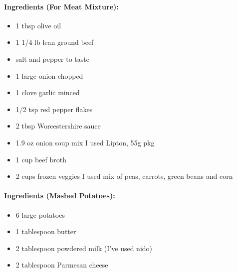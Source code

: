 \documentclass{article}
\begin{document}
\paragraph{Ingredients (For Meat Mixture):}
\begin{itemize}
    \item 1 tbsp olive oil
    \item 1 1/4 lb lean ground beef
    \item salt and pepper to taste
    \item 1 large onion chopped
    \item 1 clove garlic minced
    \item 1/2 tsp red pepper flakes
    \item 2 tbsp Worcestershire sauce
    \item 1.9 oz onion soup mix I used Lipton, 55g pkg
    \item 1 cup beef broth
    \item 2 cups frozen veggies I used mix of peas, carrots, green beans and corn
\end{itemize}  

\paragraph{Ingredients (Mashed Potatoes):}
\begin{itemize}
    \item 6 large potatoes
    \item 1 tablespoon butter
    \item 2 tablespoon powdered milk (I’ve used nido)
    \item 2 tablespoon Parmesan cheese
\end{itemize}  
\end{document}
